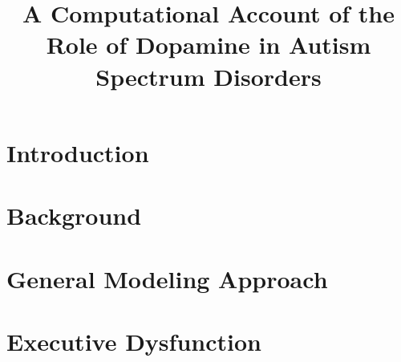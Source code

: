 \documentclass[man]{apa}
\title{A Computational Account of the Role of Dopamine in Autism Spectrum Disorders}
\begin{document}
\maketitle 

%
% 
% 


\section{Introduction}
\label{section:introduction}




\section{Background}
\label{section:background}




% 
% 


\section{General Modeling Approach}
\label{section:approach}




\section{Executive Dysfunction}
\label{section:executive}


\end{document}
